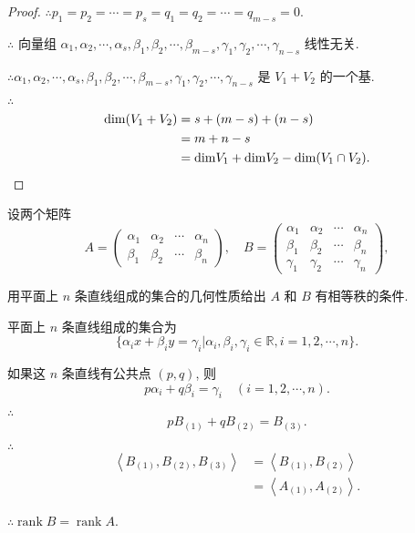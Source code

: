\documentclass{ctexart}
\begin{document}
\begin{proof}
    $\therefore p_1=p_2=\cdots=p_s=q_1=q_2=\cdots=q_{m-s}=0$.

    $\therefore$ 向量组 $\alpha_1,\alpha_2,\cdots,\alpha_s,\beta_1,\beta_2,\cdots,\beta_{m-s},\gamma_1,\gamma_2,\cdots,\gamma_{n-s}$ 线性无关.

    $\therefore\alpha_1,\alpha_2,\cdots,\alpha_s,\beta_1,\beta_2,\cdots,\beta_{m-s},\gamma_1,\gamma_2,\cdots,\gamma_{n-s}$ 是 $V_1+V_2$ 的一个基.

    $\therefore$
    \begin{align*}
        \mathrm{dim}(V_1+V_2) & =s+(m-s)+(n-s) \\
        & =m+n-s \\
        & =\mathrm{dim}V_1+\mathrm{dim}V_2-\mathrm{dim}(V_1\cap V_2).\qedhere
    \end{align*}
\end{proof}
\setcounter{exercise}{3}
\begin{exercise}%
    设两个矩阵
    \[A=\begin{pmatrix}
        \alpha_1 & \alpha_2 & \cdots & \alpha_n \\
        \beta_1 &  \beta_2 & \cdots &  \beta_n
    \end{pmatrix},\quad B=\begin{pmatrix}
        \alpha_1 & \alpha_2 & \cdots & \alpha_n \\
        \beta_1 &  \beta_2 & \cdots &  \beta_n \\
        \gamma_1 & \gamma_2 & \cdots & \gamma_n
    \end{pmatrix},\]

    用平面上 $n$ 条直线组成的集合的几何性质给出 $A$ 和 $B$ 有相等秩的条件.
\end{exercise}
\begin{solution}
    平面上 $n$ 条直线组成的集合为
    \[\{\alpha_ix+\beta_iy=\gamma_i|\alpha_i,\beta_i,\gamma_i\in\mathbb{R},i=1,2,\cdots,n\}.\]

    如果这 $n$ 条直线有公共点 $(p,q)$, 则
    \[p\alpha_i+q\beta_i=\gamma_i\quad(i=1,2,\cdots,n).\]

    $\therefore$
    \[pB_{(1)}+qB_{(2)}=B_{(3)}.\]

    $\therefore$
    \begin{align*}
        \left<B_{(1)},B_{(2)},B_{(3)}\right> & =\left<B_{(1)},B_{(2)}\right> \\
        & =\left<A_{(1)},A_{(2)}\right>.
    \end{align*}

    $\therefore\operatorname{rank}B=\operatorname{rank}A$.
\end{solution}
\end{document}

